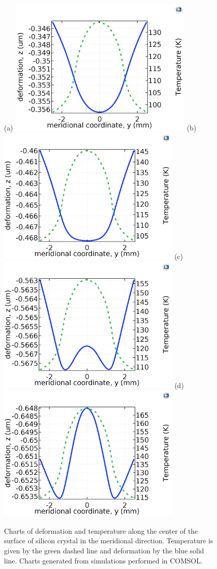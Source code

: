 \documentclass[preprint]{iucr}              %
\begin{document}
\begin{figure}

\caption{Charts of deformation and temperature along the center of the surface of silicon crystal in the meridional direction. Temperature is given by the green dashed line and deformation by the blue solid line. Charts generated from simulations performed in COMSOL.}
(a)~\includegraphics[width = 8.85cm]{images/90.png}
(b)~\includegraphics[width = 8.85cm]{images/95.png}
(c)~\includegraphics[width = 8.85cm]{images/100.png}
(d)~\includegraphics[width = 8.85cm]{images/105.png}

\end{figure}
\end{document}

